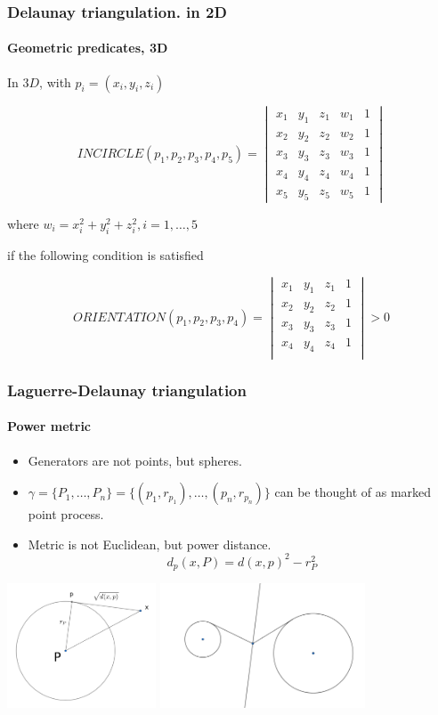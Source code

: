 \documentclass[c, 10pt]{beamer}
\begin{document}
\begin{frame}\frametitle{Delaunay triangulation. in 2D}\framesubtitle{Geometric predicates, 3D}

In $3D$, with $p_i = ( x_i, y_i, z_i)$

$$INCIRCLE(p_1,p_2,p_3,p_4, p_5) = \begin{vmatrix} x_1 & y_1 & z_1 & w_1 & 1 \\
x_2 & y_2 & z_2 & w_2 & 1 \\
x_3 & y_3 & z_3 & w_3 & 1 \\
x_4 & y_4 & z_4 & w_4 & 1 \\
x_5 & y_5 & z_5 & w_5 & 1\end{vmatrix}$$

where $w_i = x_i^2  + y_i^2 + z_i^2, i = 1,\dots, 5$

if the following condition is satisfied

$$ORIENTATION(p_1,p_2,p_3,p_4) = 
\begin{vmatrix} 
x_1 & y_1 & z_1 & 1 \\
x_2 & y_2 & z_2 & 1 \\
x_3 & y_3 & z_3 & 1 \\
x_4 & y_4 & z_4 & 1 \\
\end{vmatrix} > 0$$

\end{frame}
\begin{frame}\frametitle{Laguerre-Delaunay triangulation}\framesubtitle{Power metric}
\begin{itemize}
\item Generators are not points, but \alert{spheres}. 
\item $\gamma = \{P_1,\dots, P_n\} = \{(p_1, r_{p_1}), \dots , (p_n, r_{p_n})\}$ can be thought of as \alert{marked point process}.
\item Metric is not Euclidean, but \alert{power distance}.
$$ d_p(x,P) = d(x,p)^2 - r_P^2$$
\end{itemize}

\begin{center}
\includegraphics[height = 3.7cm]{./FigureLayout/powerdistance.png}
\includegraphics[height = 3.7cm]{./FigureLayout/perpendicularbisector.png}
\end{center}

\end{frame}
\end{document}
